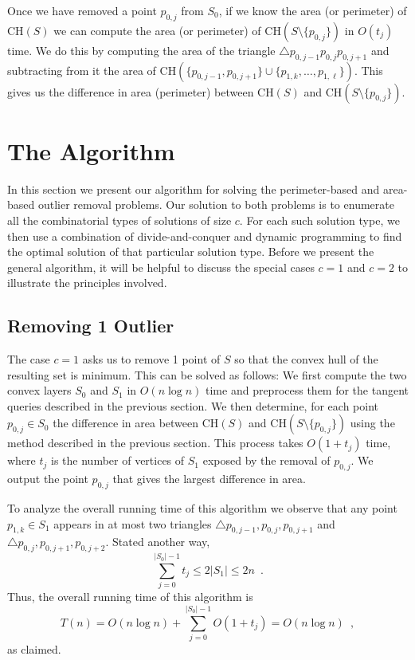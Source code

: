 \documentclass[lotsofwhite]{patmorin}
\newcommand{\ch}{\mathrm{CH}}
\begin{document}
Once we have removed a point $p_{0,j}$ from $S_0$, if we know the area
(or perimeter) of $\ch(S)$ we can compute the area (or perimeter) of
$\ch(S\setminus\{p_{0,j}\})$ in $O(t_j)$ time.  We do this by
computing the area of the triangle $\triangle
p_{0,j-1}p_{0,j}p_{0,j+1}$ and subtracting from it the area of
$\ch(\{p_{0,j-1},p_{0,j+1}\}\cup\{p_{1,k},\ldots,p_{1,\ell}\})$.  This
gives us the difference in area (perimeter) between $\ch(S)$ and
$\ch(S\setminus\{p_{0,j}\})$.


\section{The Algorithm}

In this section we present our algorithm for solving the
perimeter-based and area-based outlier removal problems. Our solution
to both problems is to enumerate all the combinatorial types of
solutions of size $c$.  For each such solution type, we then use a
combination of divide-and-conquer and dynamic programming to find the
optimal solution of that particular solution type.  Before we present
the general algorithm, it will be helpful to discuss the special cases
$c=1$ and $c=2$ to illustrate the principles involved.

\subsection{Removing 1 Outlier}

The case $c=1$ asks us to remove 1 point of $S$ so that the convex
hull of the resulting set is minimum.  This can be solved as follows:
We first compute the two convex layers $S_0$ and $S_1$ in $O(n\log n)$
time and preprocess them for the tangent queries described in the
previous section.  We then determine, for each point $p_{0,j}\in S_0$
the difference in area between $\ch(S)$ and
$\ch(S\setminus\{p_{0,j}\})$ using the method described in the
previous section.  This process takes $O(1+t_j)$ time, where $t_j$ is
the number of vertices of $S_1$ exposed by the removal of $p_{0,j}$.
We output the point $p_{0,j}$ that gives the largest difference in
area.

To analyze the overall running time of this algorithm we observe that
any point $p_{1,k}\in S_1$ appears in at most two triangles
$\triangle p_{0,j-1},p_{0,j},p_{0,j+1}$ and
$\triangle p_{0,j},p_{0,j+1},p_{0,j+2}$.  Stated another way,
\[
     \sum_{j=0}^{|S_0|-1} t_j \le 2|S_1|\le 2n \enspace .
\]
Thus, the overall running time of this algorithm is
\[
     T(n) = O(n\log n)+\sum_{j=0}^{|S_0|-1} O(1+t_j) = O(n\log n) \enspace ,
\]
as claimed.
\end{document}
